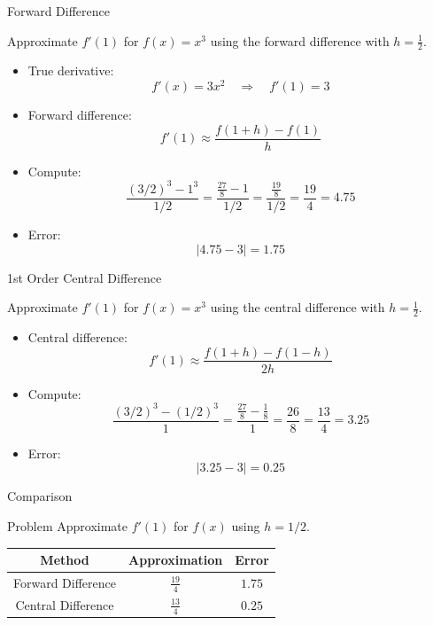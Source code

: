 \documentclass[10pt]{beamer}
\begin{document}
\begin{frame}{Forward Difference}
\begin{example}
Approximate $f'(1)$ for $f(x)=x^3$ using the forward difference with $h=\tfrac12$.
\end{example}

\begin{itemize}
    \item True derivative:
    \[
    f'(x) = 3x^2 \quad \Rightarrow \quad f'(1)=3
    \]

    \item Forward difference:
    \[
    f'(1) \approx \frac{f(1+h)-f(1)}{h}
    \]

    \item Compute:
    \[
    \frac{(3/2)^3 - 1^3}{1/2}
    = \frac{\frac{27}{8}-1}{1/2}
    = \frac{\frac{19}{8}}{1/2}
    = \frac{19}{4}
    = 4.75
    \]

    \item Error:
    \[
    |4.75 - 3| = 1.75
    \]
\end{itemize}

\end{frame}


\begin{frame}{1st Order Central Difference}
\begin{example}
Approximate $f'(1)$ for $f(x)=x^3$ using the central difference with $h=\tfrac12$.
\end{example}

\begin{itemize}
    \item Central difference:
    \[
    f'(1) \approx \frac{f(1+h)-f(1-h)}{2h}
    \]

    \item Compute:
    \[
    \frac{(3/2)^3 - (1/2)^3}{1}
    = \frac{\frac{27}{8}-\frac{1}{8}}{1}
    = \frac{26}{8}
    = \frac{13}{4}
    = 3.25
    \]

    \item Error:
    \[
    |3.25 - 3| = 0.25
    \]
\end{itemize}


\end{frame}


\begin{frame}{Comparison}
\begin{block}{Problem}
    Approximate $f'(1)$ for $f(x)$ using $h=1/2$.
\end{block}
\begin{center}
\begin{tabular}{c|c|c}
Method & Approximation & Error \\
\hline
Forward Difference & $\frac{19}{4}$ & $1.75$ \\
Central Difference & $\frac{13}{4}$ & $0.25$
\end{tabular}
\end{center}

\vspace{4mm}

\end{frame}
\end{document}
